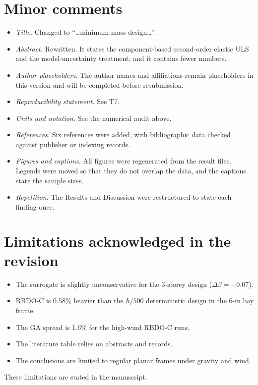 \documentclass[11pt]{article}
\begin{document}
\section*{Minor comments}
\begin{itemize}[itemsep=0.1em]
\item \emph{Title.} Changed to ``\ldots minimum-mass design\ldots''.
\item \emph{Abstract.} Rewritten. It states the component-based second-order elastic ULS and the
model-uncertainty treatment, and it contains fewer numbers.
\item \emph{Author placeholders.} The author names and affiliations remain placeholders in this
version and will be completed before resubmission.
\item \emph{Reproducibility statement.} See T7.
\item \emph{Units and notation.} See the numerical audit above.
\item \emph{References.} Six references were added, with bibliographic data checked against publisher
or indexing records.
\item \emph{Figures and captions.} All figures were regenerated from the result files. Legends were
moved so that they do not overlap the data, and the captions state the sample sizes.
\item \emph{Repetition.} The Results and Discussion were restructured to state each finding once.
\end{itemize}

\section*{Limitations acknowledged in the revision}
\begin{itemize}[itemsep=0.1em]
\item The surrogate is slightly unconservative for the 3-storey design ($\Delta\beta=-0.07$).
\item RBDO-C is 0.58\% heavier than the $h/500$ deterministic design in the 6-m bay frame.
\item The GA spread is 1.6\% for the high-wind RBDO-C runs.
\item The literature table relies on abstracts and records.
\item The conclusions are limited to regular planar frames under gravity and wind.
\end{itemize}
These limitations are stated in the manuscript.
\end{document}
